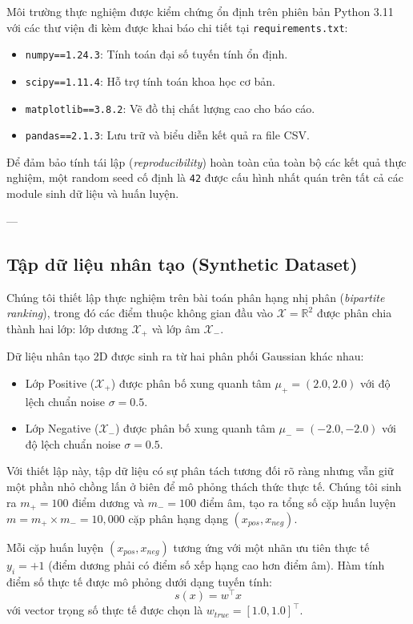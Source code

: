 Môi trường thực nghiệm được kiểm chứng ổn định trên phiên bản Python 3.11 với các thư viện đi kèm được khai báo chi tiết tại \texttt{requirements.txt}:
\begin{itemize}
    \item \texttt{numpy==1.24.3}: Tính toán đại số tuyến tính ổn định.
    \item \texttt{scipy==1.11.4}: Hỗ trợ tính toán khoa học cơ bản.
    \item \texttt{matplotlib==3.8.2}: Vẽ đồ thị chất lượng cao cho báo cáo.
    \item \texttt{pandas==2.1.3}: Lưu trữ và biểu diễn kết quả ra file CSV.
\end{itemize}

Để đảm bảo tính tái lập (\textit{reproducibility}) hoàn toàn của toàn bộ các kết quả thực nghiệm, một random seed cố định là \texttt{42} được cấu hình nhất quán trên tất cả các module sinh dữ liệu và huấn luyện.

---

\subsection{Tập dữ liệu nhân tạo (Synthetic Dataset)}
Chúng tôi thiết lập thực nghiệm trên bài toán phân hạng nhị phân (\textit{bipartite ranking}), trong đó các điểm thuộc không gian đầu vào $\mathcal{X} = \mathbb{R}^2$ được phân chia thành hai lớp: lớp dương $\mathcal{X}_+$ và lớp âm $\mathcal{X}_-$.

Dữ liệu nhân tạo 2D được sinh ra từ hai phân phối Gaussian khác nhau:
\begin{itemize}
    \item Lớp Positive ($\mathcal{X}_+$) được phân bố xung quanh tâm $\mu_+ = (2.0, 2.0)$ với độ lệch chuẩn noise $\sigma = 0.5$.
    \item Lớp Negative ($\mathcal{X}_-$) được phân bố xung quanh tâm $\mu_- = (-2.0, -2.0)$ với độ lệch chuẩn noise $\sigma = 0.5$.
\end{itemize}
Với thiết lập này, tập dữ liệu có sự phân tách tương đối rõ ràng nhưng vẫn giữ một phần nhỏ chồng lấn ở biên để mô phỏng thách thức thực tế. Chúng tôi sinh ra $m_+ = 100$ điểm dương và $m_- = 100$ điểm âm, tạo ra tổng số cặp huấn luyện $m = m_+ \times m_- = 10,000$ cặp phân hạng dạng $(x_{pos}, x_{neg})$.

Mỗi cặp huấn luyện $(x_{pos}, x_{neg})$ tương ứng với một nhãn ưu tiên thực tế $y_i = +1$ (điểm dương phải có điểm số xếp hạng cao hơn điểm âm). Hàm tính điểm số thực tế được mô phỏng dưới dạng tuyến tính:
\begin{equation}
    s(x) = w^\top x
\end{equation}
với vector trọng số thực tế được chọn là $w_{true} = [1.0, 1.0]^\top$.

